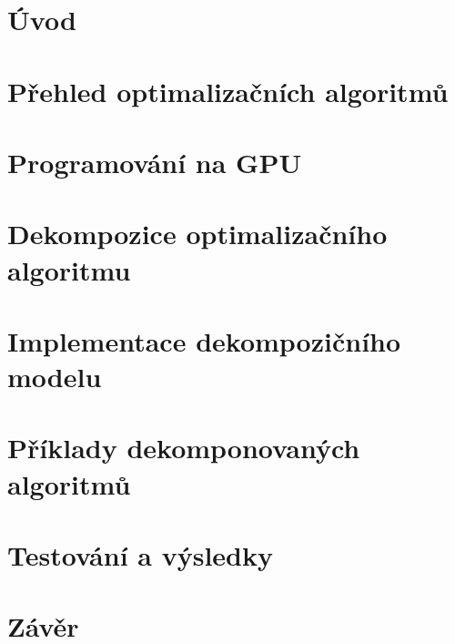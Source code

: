 \documentclass[oneside,11pt,a4paper]{report}
\newif\ifrelease %
\theoremstyle{plain}
\begin{document}
\ifrelease
\fi
    \newpage
    \tableofcontents

    \chapter*{Úvod}
        

    \chapter{Přehled optimalizačních algoritmů}\label{heuristiky}
        

    \chapter{Programování na GPU}\label{GPUkapitola}
        

    \chapter{Dekompozice optimalizačního algoritmu}
        

    \chapter{Implementace dekompozičního modelu}
        
        
    \chapter{Příklady dekomponovaných algoritmů}
        
        
    \chapter{Testování a výsledky}
        
    \chapter*{Závěr}
         
        
     \appendix

    





    
\end{document}
